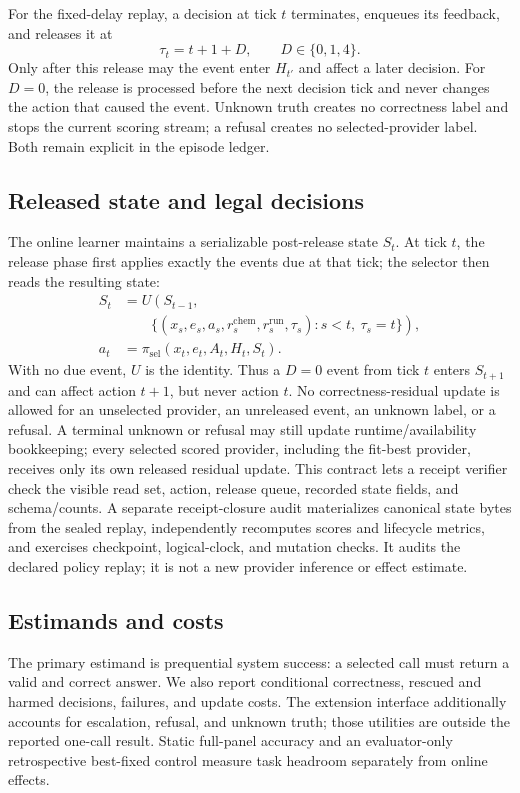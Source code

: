 \documentclass[sigconf,anonymous]{aamas}
\begin{document}
For the fixed-delay replay, a decision at tick $t$ terminates, enqueues its feedback, and releases it at
$$
\tau_t=t+1+D,\qquad D\in\{0,1,4\}.
$$
Only after this release may the event enter $H_{t'}$ and affect a later decision. For $D=0$, the release is processed before the next decision tick and never changes the action that caused the event. Unknown truth creates no correctness label and stops the current scoring stream; a refusal creates no selected-provider label. Both remain explicit in the episode ledger.

\subsection{Released state and legal decisions}
The online learner maintains a serializable post-release state $S_t$. At tick $t$, the release phase first applies exactly the events due at that tick; the selector then reads the resulting state:
$$
\begin{aligned}
S_t&=U\left(S_{t-1},\right.\\[-2pt]
&\qquad\left.\{(x_s,e_s,a_s,r_s^{\mathrm{chem}},r_s^{\mathrm{run}},\tau_s):s<t,\ \tau_s=t\}\right),\\
a_t&=\pi_{\mathrm{sel}}(x_t,e_t,A_t,H_t,S_t).
\end{aligned}
$$
With no due event, $U$ is the identity. Thus a $D=0$ event from tick $t$ enters $S_{t+1}$ and can affect action $t+1$, but never action $t$.
No correctness-residual update is allowed for an unselected provider, an unreleased event, an unknown label, or a refusal. A terminal unknown or refusal may still update runtime/availability bookkeeping; every selected scored provider, including the fit-best provider, receives only its own released residual update. This contract lets a receipt verifier check the visible read set, action, release queue, recorded state fields, and schema/counts. A separate receipt-closure audit materializes canonical state bytes from the sealed replay, independently recomputes scores and lifecycle metrics, and exercises checkpoint, logical-clock, and mutation checks. It audits the declared policy replay; it is not a new provider inference or effect estimate.

\subsection{Estimands and costs}
The primary estimand is prequential system success: a selected call must return a valid and correct answer. We also report conditional correctness, rescued and harmed decisions, failures, and update costs. The extension interface additionally accounts for escalation, refusal, and unknown truth; those utilities are outside the reported one-call result. Static full-panel accuracy and an evaluator-only retrospective best-fixed control measure task headroom separately from online effects.
\end{document}
